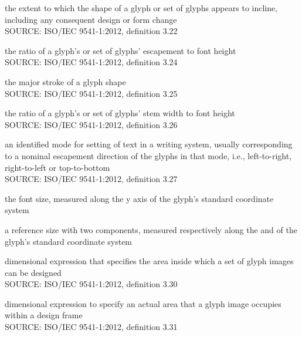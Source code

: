 the extent to which the shape of a glyph or set of glyphs appears to incline, including any consequent design or form change \\
\lbrack SOURCE: ISO/IEC 9541-1:2012, definition 3.22 \rbrack

the ratio of a glyph's or set of glyphs' escapement to font height \\
\lbrack SOURCE: ISO/IEC 9541-1:2012, definition 3.24 \rbrack

the major stroke of a glyph shape \\
\lbrack SOURCE: ISO/IEC 9541-1:2012, definition 3.25 \rbrack

the ratio of a glyph's or set of glyphs' stem width to font height \\
\lbrack SOURCE: ISO/IEC 9541-1:2012, definition 3.26 \rbrack

an identified mode for setting of text in a writing system, usually corresponding to a nominal escapement direction of the glyphs in that mode, i.e., left-to-right, right-to-left or top-to-bottom \\
\lbrack SOURCE: ISO/IEC 9541-1:2012, definition 3.27 \rbrack

the font size, measured along the y axis of the glyph's standard coordinate system

a reference size with two components, measured respectively along the \xaxis and \yaxis of the glyph's standard coordinate system

dimensional expression that specifies the area inside which a set of glyph images can be designed \\
\lbrack SOURCE: ISO/IEC 9541-1:2012, definition 3.30 \rbrack

dimensional expression to specify an actual area that a glyph image occupies within a design frame \\
\lbrack SOURCE: ISO/IEC 9541-1:2012, definition 3.31 \rbrack
%
